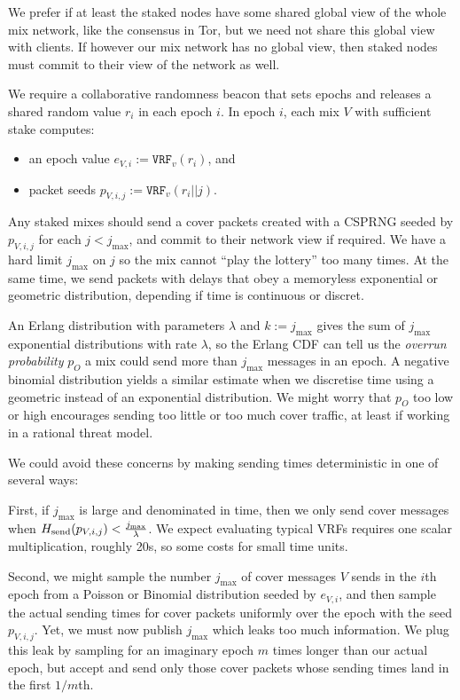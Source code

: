 ﻿\documentclass{sig-alternate-hotpets}
\newcommand{\microseconds}{\textmu s}
\begin{document}
We prefer if at least the staked nodes have some shared global view of the whole mix network, like the consensus in Tor, but we need not share this global view with clients.  If however our mix network has no global view, then staked nodes must commit to their view of the network as well. 

We require a collaborative randomness beacon that sets epochs and releases a shared random value $r_i$ in each epoch $i$.  In epoch $i$, each mix $V$ with sufficient stake computes:
\begin{itemize}
\item an epoch value $e_{V,i} := \mathtt{VRF}_v(r_i)$, and
\item packet seeds $p_{V,i,j} := \mathtt{VRF}_v(r_i || j)$.
\end{itemize}

Any staked mixes should send a cover packets created with a CSPRNG seeded by $p_{V,i,j}$ for each $j < j_{\max}$, and commit to their network view if required.  We have a hard limit $j_{\max}$ on $j$ so the mix cannot ``play the lottery'' too many times.  At the same time, we send packets with delays that obey a memoryless exponential or geometric distribution, depending if time is continuous or discret. 

An Erlang distribution with parameters $\lambda$ and $k := j_{\max}$ gives the sum of $j_{\max}$ exponential distributions with rate $\lambda$, so the Erlang CDF can tell us the {\em overrun probability} $p_O$ a mix could send more than $j_{\max}$ messages in an epoch.  A negative binomial distribution yields a similar estimate when we discretise time using a geometric instead of an exponential distribution.  We might worry that $p_O$ too low or high encourages sending too little or too much cover traffic, at least if working in a rational threat model.  

We could avoid these concerns by making sending times deterministic in
one of several ways:

First, if $j_{\max}$ is large and denominated in time, then we only send 
cover messages when $H_{\mathrm{send}}(p_{V,i,j}) < {j_{\max} \over \lambda}$. 
We expect evaluating typical VRFs requires one scalar multiplication,
roughly 20\microseconds, so some costs for small time units.

Second, we might sample the number $j_{\max}$ of cover messages $V$
sends in the $i$th epoch from a Poisson or Binomial distribution seeded
by $e_{V,i}$, and then sample the actual sending times for cover packets
uniformly over the epoch with the seed $p_{V,i,j}$.  Yet, we must now
publish $j_{\max}$ which leaks too much information.  We plug this leak
by sampling for an imaginary epoch $m$ times longer than our actual
epoch, but accept and send only those cover packets whose sending times
land in the first $1/m$th.  
\end{document}

